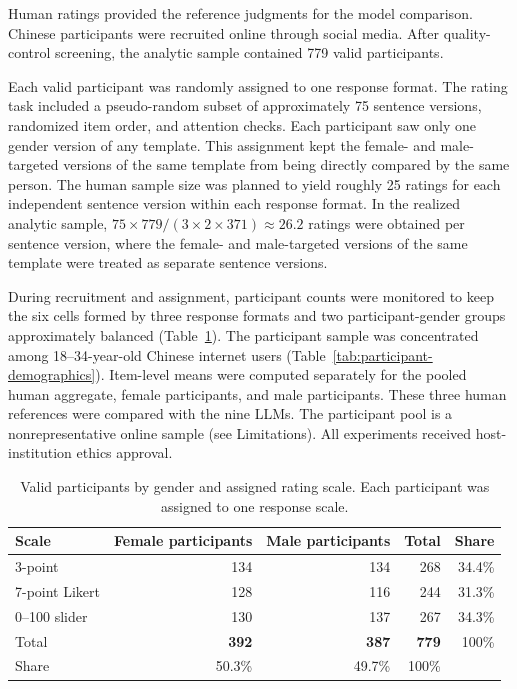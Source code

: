 \documentclass[a4paper,fleqn,review,longmktitle]{cas-sc}
\begin{document}
Human ratings provided the reference judgments for the model comparison. Chinese participants were recruited online through social media. After quality-control screening, the analytic sample contained 779 valid participants.

Each valid participant was randomly assigned to one response format. The rating task included a pseudo-random subset of approximately 75 sentence versions, randomized item order, and attention checks. Each participant saw only one gender version of any template. This assignment kept the female- and male-targeted versions of the same template from being directly compared by the same person. The human sample size was planned to yield roughly 25 ratings for each independent sentence version within each response format. In the realized analytic sample, $75 \times 779 / (3 \times 2 \times 371) \approx 26.2$ ratings were obtained per sentence version, where the female- and male-targeted versions of the same template were treated as separate sentence versions.

During recruitment and assignment, participant counts were monitored to keep the six cells formed by three response formats and two participant-gender groups approximately balanced (Table~\ref{tab:session-balance}). The participant sample was concentrated among 18--34-year-old Chinese internet users (Table~\ref{tab:participant-demographics}). Item-level means were computed separately for the pooled human aggregate, female participants, and male participants. These three human references were compared with the nine LLMs. The participant pool is a nonrepresentative online sample (see Limitations). All experiments received host-institution ethics approval.

\begin{table}[t]
  \centering
  \small
  \begin{tabular}{lrrr|r}
    \toprule
    Scale & Female participants & Male participants & Total & Share \\
    \midrule
    3-point & 134 & 134 & 268 & 34.4\% \\
    7-point Likert & 128 & 116 & 244 & 31.3\% \\
    0--100 slider & 130 & 137 & 267 & 34.3\% \\
    \midrule
    Total & \textbf{392} & \textbf{387} & \textbf{779} & 100\% \\
    Share & 50.3\% & 49.7\% & 100\% & \\
    \bottomrule
  \end{tabular}
  \caption{Valid participants by gender and assigned rating scale. Each participant was assigned to one response scale.}
  \label{tab:session-balance}
\end{table}
\end{document}
